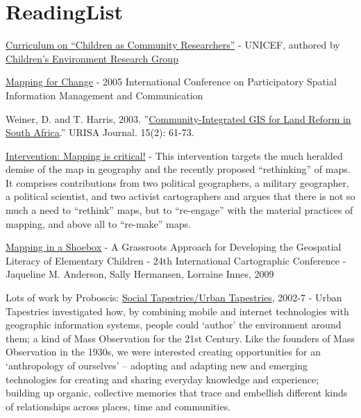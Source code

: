 \documentclass[11pt]{report}
\begin{document}
\chapter*{ReadingList}

\href{http://www.unicef.org/teachers/researchers/intro.htm}{Curriculum on ``{}Children as Community Researchers''{}} - UNICEF, authored by \href{http://web.gc.cuny.edu/che/cerg/about_cerg/environmental_learning_index.htm}{Children'{}s Environment Research Group}

\href{http://www.iapad.org/pgis2005/}{Mapping for Change} - 2005 International Conference on Participatory Spatial Information Management and Communication

Weiner, D. and T. Harris, 2003. ''{}\href{http://www.rri.wvu.edu/pdffiles/gisweiner.pdf}{Community-Integrated GIS for Land Reform in South Africa}.''{} URISA Journal. 15(2): 61-73.

\href{http://www.sciencedirect.com/science?_ob=ArticleURL&_udi=B6VG2-4XHJX4B-1&_user=10&_coverDate=08/31/2009&_rdoc=1&_fmt=high&_orig=search&_sort=d&_docanchor=&view=c&_searchStrId=1186930669&_rerunOrigin=google&_acct=C000050221&_version=1&_urlVersion=0&_userid=10&md5=a9327ffa62e089e863f892a4551c1717}{Intervention: Mapping is critical!} - This intervention targets the much heralded demise of the map in geography and the recently proposed “rethinking” of maps. It comprises contributions from two political geographers, a military geographer, a political scientist, and two activist cartographers and argues that there is not so much a need to “rethink” maps, but to “re-engage” with the material practices of mapping, and above all to “re-make” maps.

\href{http://training.esri.com/campus/library/bibliography/RecordDetail.cfm?ID=95545&browseonly=0}{Mapping in a Shoebox} - A Grassroots Approach for Developing the Geospatial Literacy of Elementary Children - 24th International Cartographic Conference - Jaqueline M. Anderson, Sally Hermansen, Lorraine Innes, 2009

Lots of work by Proboscis: \href{http://urbantapestries.net/}{Social Tapestries/Urban Tapestries}, 2002-7 - Urban Tapestries investigated how, by combining mobile and internet technologies with geographic information systems, people could `author' the environment around them; a kind of Mass Observation for the 21st Century. Like the founders of Mass Observation in the 1930s, we were interested creating opportunities for an `anthropology of ourselves' – adopting and adapting new and emerging technologies for creating and sharing everyday knowledge and experience; building up organic, collective memories that trace and embellish different kinds of relationships across places, time and communities.
\end{document}
